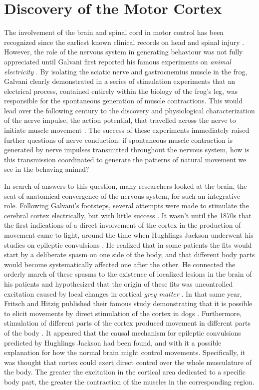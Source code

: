 \section{Discovery of the Motor Cortex}

The involvement of the brain and spinal cord in motor control has been recognized since the earliest known clinical records on head and spinal injury \cite{Breasted1930,VanMiddendorp2010}. However, the role of the nervous system in generating behaviour was not fully appreciated until Galvani first reported his famous experiments on \textit{animal electricity} \cite{Galvani1791}. By isolating the sciatic nerve and gastrocnemius muscle in the frog, Galvani clearly demonstrated in a series of stimulation experiments that an electrical process, contained entirely within the biology of the frog's leg, was responsible for the spontaneous generation of muscle contractions. This would lead over the following century to the discovery and physiological characterization of the nerve impulse, the action potential, that travelled across the nerve to initiate muscle movement \cite{DuBois-Reymond1843,Bernstein1868}. The success of these experiments immediately raised further questions of nerve conduction: if spontaneous muscle contraction is generated by nerve impulses transmitted throughout the nervous system, how is this transmission coordinated to generate the patterns of natural movement we see in the behaving animal?

In search of answers to this question, many researchers looked at the brain, the seat of anatomical convergence of the nervous system, for such an integrative role. Following Galvani's footsteps, several attempts were made to stimulate the cerebral cortex electrically, but with little success \cite{Gross2007}. It wasn't until the 1870s that the first indications of a direct involvement of the cortex in the production of movement came to light, around the time when Hughlings Jackson underwent his studies on epileptic convulsions \cite{Jackson1870}. He realized that in some patients the fits would start by a deliberate spasm on one side of the body, and that different body parts would become systematically affected one after the other. He connected the orderly march of these spasms to the existence of localized lesions in the brain of his patients and hypothesized that the origin of these fits was uncontrolled excitation caused by local changes in cortical \emph{grey matter} \cite{Jackson1870}. In that same year, Fritsch and Hitzig published their famous study demonstrating that it is possible to elicit movements by direct stimulation of the cortex in dogs \cite{Fritsch1870}. Furthermore, stimulation of different parts of the cortex produced movement in different parts of the body \cite{Fritsch1870}. It appeared that the causal mechanism for epileptic convulsions predicted by Hughlings Jackson had been found, and with it a possible explanation for how the normal brain might control movements. Specifically, it was thought that cortex could exert direct control over the whole musculature of the body. The greater the excitation in the cortical area dedicated to a specific body part, the greater the contraction of the muscles in the corresponding region.

